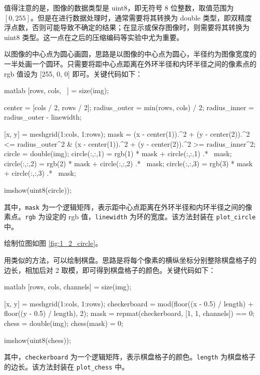 \documentclass[a4paper]{article}  %
\begin{document}
值得注意的是，图像的数据类型是 uint8，即无符号 8 位整数，取值范围为 $[0, 255]$。但是在进行数据处理时，通常需要将其转换为 double 类型，即双精度浮点数，否则可能导致不确定的结果；在显示或保存图像时，则需要将其转换为 uint8 类型。这一点在之后的压缩编码等实验中尤为重要。

以图像的中心点为圆心画圆，思路是以图像的中心点为圆心，半径约为图像宽度的一半处画一个圆环。只需要将距中心点距离在外环半径和内环半径之间的像素点的 rgb 值设为 [255, 0, 0] 即可。关键代码如下：

\begin{codeblock}{matlab}
    [rows, cols, ~] = size(img);

    center = [cols / 2, rows / 2];
    radius_outer = min(rows, cols) / 2;  %
    radius_inner = radius_outer - linewidth;  %

    [x, y] = meshgrid(1:cols, 1:rows);  %
    mask = (x - center(1)).^2 + (y - center(2)).^2 <= radius_outer^2 & (x - center(1)).^2 + (y - center(2)).^2 >= radius_inner^2;
    circle = double(img);
    circle(:,:,1) = rgb(1) * mask + circle(:,:,1) .* ~mask;  %
    circle(:,:,2) = rgb(2) * mask + circle(:,:,2) .* ~mask;
    circle(:,:,3) = rgb(3) * mask + circle(:,:,3) .* ~mask;

    imshow(uint8(circle));
\end{codeblock}

其中，\texttt{mask} 为一个逻辑矩阵，表示距中心点距离在外环半径和内环半径之间的像素点。\texttt{rgb} 为设定的 rgb 值，\texttt{linewidth} 为环的宽度。该方法封装在 \texttt{plot\_circle} 中。

绘制位图如图 \ref{fig:1_2_circle}。

用类似的方法，可以绘制棋盘。思路是将每个像素的横纵坐标分别整除棋盘格子的边长，相加后对 2 取模，即可得到棋盘格子的颜色。关键代码如下：

\begin{codeblock}{matlab}
    [rows, cols, channels] = size(img);

    [x, y] = meshgrid(1:cols, 1:rows);  %
    checkerboard = mod(floor((x - 0.5) / length) + floor((y - 0.5) / length), 2);  %
    mask = repmat(checkerboard, [1, 1, channels]) == 0;  %
    chess = double(img);
    chess(mask) = 0;

    imshow(uint8(chess));
\end{codeblock}

其中，\texttt{checkerboard} 为一个逻辑矩阵，表示棋盘格子的颜色。\texttt{length} 为棋盘格子的边长。该方法封装在 \texttt{plot\_chess} 中。
\end{document}
